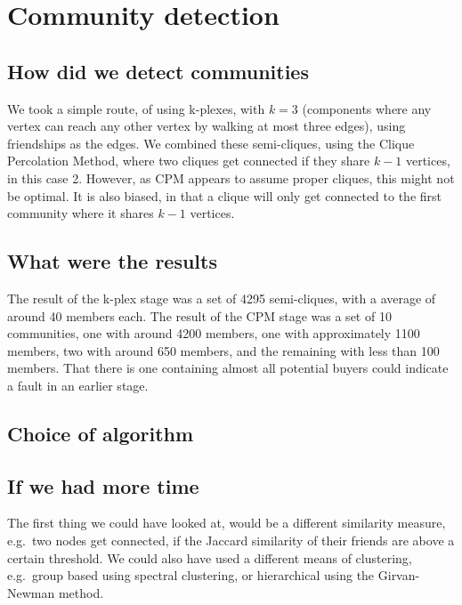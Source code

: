 \section{Community detection}

\subsection{How did we detect communities}
We took a simple route, of using k-plexes, with $k = 3$ (components where any vertex can reach any other vertex by walking at most three edges), using friendships as the edges. We combined these semi-cliques, using the Clique Percolation Method, where two cliques get connected if they share $k - 1$ vertices, in this case 2. However, as CPM appears to assume proper cliques, this might not be optimal. It is also biased, in that a clique will only get connected to the first community where it shares $k - 1$ vertices.

\subsection{What were the results}
The result of the k-plex stage was a set of 4295 semi-cliques, with a average of around 40 members each. The result of the CPM stage was a set of 10 communities, one with around 4200 members, one with approximately 1100 members, two with around 650 members, and the remaining with less than 100 members. That there is one containing almost all potential buyers could indicate a fault in an earlier stage.

\subsection{Choice of algorithm}


\subsection{If we had more time}
The first thing we could have looked at, would be a different similarity measure, e.g.\ two nodes get connected, if the Jaccard similarity of their friends are above a certain threshold. We could also have used a different means of clustering, e.g.\ group based using spectral clustering, or hierarchical using the Girvan-Newman method.